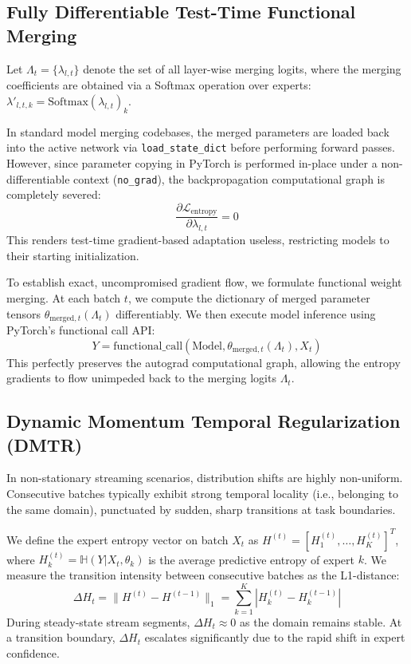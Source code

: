 \documentclass{article}
\begin{document}
\subsection{Fully Differentiable Test-Time Functional Merging}
Let $\Lambda_t = \{\lambda_{l,t}\}$ denote the set of all layer-wise merging logits, where the merging coefficients are obtained via a Softmax operation over experts: $\lambda'_{l,t,k} = \text{Softmax}(\lambda_{l,t})_k$. 

In standard model merging codebases, the merged parameters are loaded back into the active network via \texttt{load_state_dict} before performing forward passes. However, since parameter copying in PyTorch is performed in-place under a non-differentiable context (\texttt{no_grad}), the backpropagation computational graph is completely severed:
\begin{equation}
    \frac{\partial \mathcal{L}_{\text{entropy}}}{\partial \lambda_{l,t}} = 0
\end{equation}
This renders test-time gradient-based adaptation useless, restricting models to their starting initialization.

To establish exact, uncompromised gradient flow, we formulate functional weight merging. At each batch $t$, we compute the dictionary of merged parameter tensors $\theta_{\text{merged}, t}(\Lambda_t)$ differentiably. We then execute model inference using PyTorch's functional call API:
\begin{equation}
    Y = \text{functional\_call}(\text{Model}, \theta_{\text{merged}, t}(\Lambda_t), X_t)
\end{equation}
This perfectly preserves the autograd computational graph, allowing the entropy gradients to flow unimpeded back to the merging logits $\Lambda_t$.

\subsection{Dynamic Momentum Temporal Regularization (DMTR)}
In non-stationary streaming scenarios, distribution shifts are highly non-uniform. Consecutive batches typically exhibit strong temporal locality (i.e., belonging to the same domain), punctuated by sudden, sharp transitions at task boundaries.

We define the expert entropy vector on batch $X_t$ as $H^{(t)} = [H_1^{(t)}, \dots, H_K^{(t)}]^T$, where $H_k^{(t)} = \mathbb{H}(Y | X_t, \theta_k)$ is the average predictive entropy of expert $k$. We measure the transition intensity between consecutive batches as the L1-distance:
\begin{equation}
    \Delta H_t = \|H^{(t)} - H^{(t-1)}\|_1 = \sum_{k=1}^K |H_k^{(t)} - H_k^{(t-1)}|
\end{equation}
During steady-state stream segments, $\Delta H_t \approx 0$ as the domain remains stable. At a transition boundary, $\Delta H_t$ escalates significantly due to the rapid shift in expert confidence.
\end{document}
